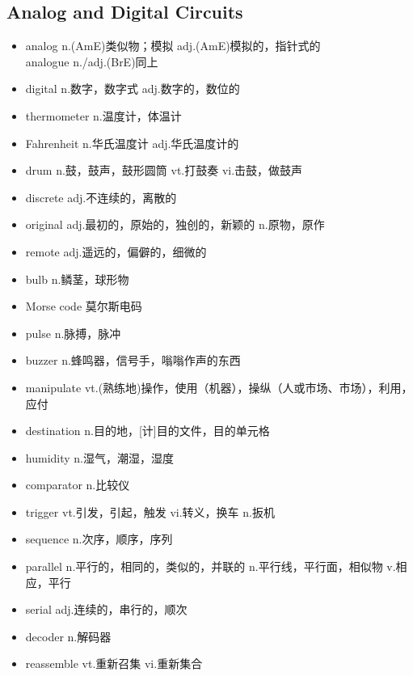 \documentclass[11pt,a4paper,UTF8,titlepage]{ctexrep} %
\begin{document}
    \subsection{Analog and Digital Circuits}
    \begin{multicols}{2}
        \begin{itemize}
            \item analog n.(AmE)类似物；模拟 adj.(AmE)模拟的，指针式的\\analogue n./adj.(BrE)同上
            \item digital n.数字，数字式 adj.数字的，数位的
            \item thermometer n.温度计，体温计
            \item Fahrenheit n.华氏温度计 adj.华氏温度计的
            \item drum n.鼓，鼓声，鼓形圆筒 vt.打鼓奏 vi.击鼓，做鼓声
            \item discrete adj.不连续的，离散的
            \item original adj.最初的，原始的，独创的，新颖的 n.原物，原作
            \item remote adj.遥远的，偏僻的，细微的
            \item bulb n.鳞茎，球形物
            \item Morse code 莫尔斯电码
            \item pulse n.脉搏，脉冲
            \item buzzer n.蜂鸣器，信号手，嗡嗡作声的东西
            \item manipulate vt.(熟练地)操作，使用（机器），操纵（人或市场、市场），利用，应付
            \item destination n.目的地，[计]目的文件，目的单元格
            \item humidity n.湿气，潮湿，湿度
            \item comparator n.比较仪
            \item trigger vt.引发，引起，触发 vi.转义，换车 n.扳机
            \item sequence n.次序，顺序，序列
            \item parallel n.平行的，相同的，类似的，并联的 n.平行线，平行面，相似物 v.相应，平行
            \item serial adj.连续的，串行的，顺次
            \item decoder n.解码器
            \item reassemble vt.重新召集 vi.重新集合
        \end{itemize}
    \end{multicols}
\end{document}
